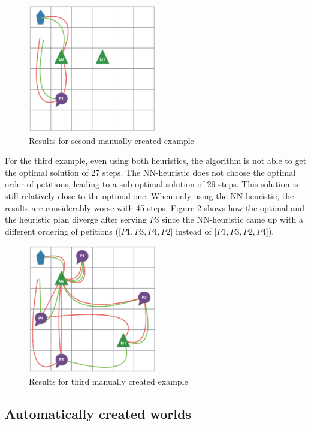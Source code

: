 \begin{figure}[!hbt]
  \centering
  \includegraphics[width=0.5\textwidth]{img/t2}
  \caption{Results for second manually created example}
  \label{fig:t2}
\end{figure}

For the third example, even using both heuristics, the algorithm is not able to get the optimal solution of 27 steps. The NN-heuristic does not choose the optimal order of petitions, leading to a sub-optimal solution of 29 steps. This solution is still relatively close to the optimal one. When only using the NN-heuristic, the results are considerably worse with 45 steps. Figure \ref{fig:t3} shows how the optimal and the heuristic plan diverge after serving $P3$ since the NN-heuristic came up with a different ordering of petitions ([$P1, P3, P4, P2$] instead of [$P1, P3, P2, P4$]).

\begin{figure}[!hbt]
  \centering
  \includegraphics[width=0.5\textwidth]{img/t3}
  \caption{Results for third manually created example}
  \label{fig:t3}
\end{figure}

\subsection{Automatically created worlds}


